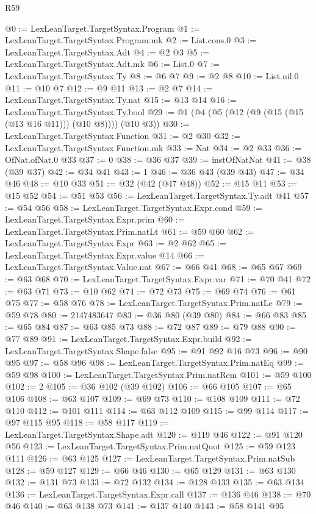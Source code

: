 \begin{lexlean}{R59}
\begin{coremodule}
@0 := LexLeanTarget.TargetSyntax.Program
@1 := LexLeanTarget.TargetSyntax.Program.mk
@2 := List.cons.{0}
@3 := LexLeanTarget.TargetSyntax.Adt
@4 := @2 @3
@5 := LexLeanTarget.TargetSyntax.Adt.mk
@6 := List.{0}
@7 := LexLeanTarget.TargetSyntax.Ty
@8 := @6 @7
@9 := @2 @8
@10 := List.nil.{0}
@11 := @10 @7
@12 := @9 @11
@13 := @2 @7
@14 := LexLeanTarget.TargetSyntax.Ty.nat
@15 := @13 @14
@16 := LexLeanTarget.TargetSyntax.Ty.bool
@29 := @1 (@4 (@5 (@12 (@9 (@15 (@15 (@13 @16 @11))) (@10 @8)))) (@10 @3))
@30 := LexLeanTarget.TargetSyntax.Function
@31 := @2 @30
@32 := LexLeanTarget.TargetSyntax.Function.mk
@33 := Nat
@34 := @2 @33
@36 := OfNat.ofNat.{0} @33
@37 := 0
@38 := @36 @37
@39 := instOfNatNat
@41 := @38 (@39 @37)
@42 := @34 @41
@43 := 1
@46 := @36 @43 (@39 @43)
@47 := @34 @46
@48 := @10 @33
@51 := @32 (@42 (@47 @48))
@52 := @15 @11
@53 := @15 @52
@54 := @51 @53
@56 := LexLeanTarget.TargetSyntax.Ty.adt @41
@57 := @54 @56
@58 := LexLeanTarget.TargetSyntax.Expr.cond
@59 := LexLeanTarget.TargetSyntax.Expr.prim
@60 := LexLeanTarget.TargetSyntax.Prim.natLt
@61 := @59 @60
@62 := LexLeanTarget.TargetSyntax.Expr
@63 := @2 @62
@65 := LexLeanTarget.TargetSyntax.Expr.value @14
@66 := LexLeanTarget.TargetSyntax.Value.nat
@67 := @66 @41
@68 := @65 @67
@69 := @63 @68
@70 := LexLeanTarget.TargetSyntax.Expr.var
@71 := @70 @41
@72 := @63 @71
@73 := @10 @62
@74 := @72 @73
@75 := @69 @74
@76 := @61 @75
@77 := @58 @76
@78 := LexLeanTarget.TargetSyntax.Prim.natLe
@79 := @59 @78
@80 := 2147483647
@83 := @36 @80 (@39 @80)
@84 := @66 @83
@85 := @65 @84
@87 := @63 @85 @73
@88 := @72 @87
@89 := @79 @88
@90 := @77 @89
@91 := LexLeanTarget.TargetSyntax.Expr.build
@92 := LexLeanTarget.TargetSyntax.Shape.false
@95 := @91 @92 @16 @73
@96 := @90 @95
@97 := @58 @96
@98 := LexLeanTarget.TargetSyntax.Prim.natEq
@99 := @59 @98
@100 := LexLeanTarget.TargetSyntax.Prim.natRem
@101 := @59 @100
@102 := 2
@105 := @36 @102 (@39 @102)
@106 := @66 @105
@107 := @65 @106
@108 := @63 @107
@109 := @69 @73
@110 := @108 @109
@111 := @72 @110
@112 := @101 @111
@114 := @63 @112 @109
@115 := @99 @114
@117 := @97 @115 @95
@118 := @58 @117
@119 := LexLeanTarget.TargetSyntax.Shape.adt
@120 := @119 @46
@122 := @91 @120 @56
@123 := LexLeanTarget.TargetSyntax.Prim.natQuot
@125 := @59 @123 @111
@126 := @63 @125
@127 := LexLeanTarget.TargetSyntax.Prim.natSub
@128 := @59 @127
@129 := @66 @46
@130 := @65 @129
@131 := @63 @130
@132 := @131 @73
@133 := @72 @132
@134 := @128 @133
@135 := @63 @134
@136 := LexLeanTarget.TargetSyntax.Expr.call
@137 := @136 @46
@138 := @70 @46
@140 := @63 @138 @73
@141 := @137 @140
@143 := @58 @141 @95

\end{coremodule}
\end{lexlean}
